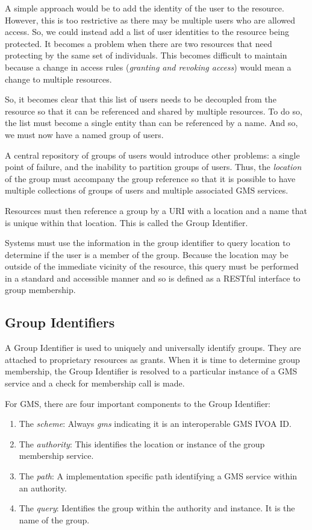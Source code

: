 \documentclass[11pt,a4paper]{ivoa}
\begin{document}
A simple approach would be to add the identity of the user to the resource.  However, this is too restrictive as there may be multiple users who are allowed access.  So, we could instead add a list of user identities to the resource being protected.  It becomes a problem when there are two resources that need protecting by the same set of individuals.  This becomes difficult to maintain because a change in access rules (\emph{granting and revoking access}) would mean a change to multiple resources.

So, it becomes clear that this list of users needs to be decoupled from the resource so that it can be referenced and shared by multiple resources.  To do so, the list must become a single entity than can be referenced by a name.  And so, we must now have a named group of users.

A central repository of groups of users would introduce other problems:  a single point of failure, and the inability to partition groups of users.  Thus, the \emph{location} of the group must accompany the group reference so that it is possible to have multiple collections of groups of users and multiple associated GMS services.

Resources must then reference a group by a URI with a location and a name that is unique within that location.  This is called the Group Identifier.

Systems must use the information in the group identifier to query location to determine if the user is a member of the group.  Because the location may be outside of the immediate vicinity of the resource, this query must be performed in a standard and accessible manner and so is defined as a RESTful interface to group membership.

\subsection{Group Identifiers}

A Group Identifier is used to uniquely and universally identify groups.  They are attached to proprietary resources as grants.  When it is time to determine group membership, the Group Identifier is resolved to a particular instance of a GMS service and a check for membership call is made.

For GMS, there are four important components to the Group Identifier:

\begin{enumerate}
\item The \emph{scheme}: Always \emph{gms} indicating it is an interoperable GMS IVOA ID.
\item The \emph{authority}: This identifies the location or instance of the group membership service.
\item The \emph{path}: A implementation specific path identifying a GMS service within an authority.
\item The \emph{query}: Identifies the group within the authority and instance.  It is the name of the group.
\end{enumerate}
\end{document}
